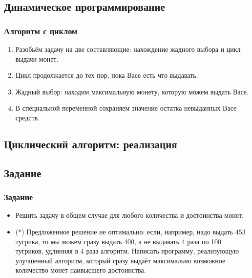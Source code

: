 \documentclass[compress,red]{beamer}
\begin{document}
\subsection{Динамическое программирование}
\begin{frame}[fragile]
  \frametitle{Алгоритм с циклом}
	\begin{enumerate}
		\item Разобьём задачу на две составляющие: нахождение жадного выбора и цикл выдачи монет.
		\item Цикл продолжается до тех пор, пока Васе есть что выдавать.
		\item Жадный выбор: находим максимальную монету, которую можем выдать Васе.
		\item В специальной переменной сохраняем значение остатка невыданных Васе средств.
	\end{enumerate}
\end{frame}

\subsection{Циклический алгоритм: реализация}
\begin{frame}[fragile]
  \frametitle{Реализация циклом}
  \scriptsize{
  \begin{lstlisting}[label=ruby2,language=ruby,caption=Монеты циклом]
		coins = [1,2,5,10,20,50,100]
		n = 48 

		while (n != 0)
		  max = coins.find_all{|elem| elem<=n}.max
		  puts max
		  n = n - max
		end
  \end{lstlisting}}}
  
\end{frame}

\subsection{Задание}
\begin{frame}[fragile]
  \frametitle{Задание}
	\begin{itemize}
		\item Решить задачу в общем случае для любого количества и достоинства монет.
		\item (*) Предложенное решение не оптимально: если, например, надо выдать 453 тугрика, то мы можем сразу выдать 400, а не выдавать 4 раза по 100 тугриков, удлинняя в 4 раза алгоритм. Написать программу, реализующую улучшенный алгоритм, который сразу выдаёт максимально возможное количество монет наивысшего достоинства. 
	\end{itemize}
\end{frame}
\end{document}
